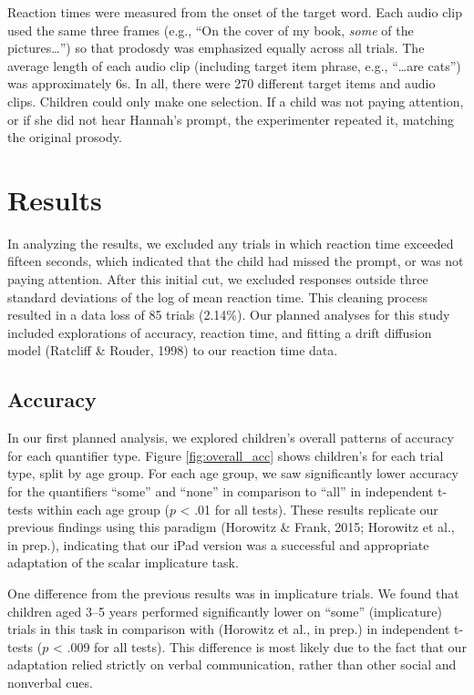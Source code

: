 \documentclass[10pt, letterpaper]{article}
\begin{document}
Reaction times were measured from the onset of the target word. Each
audio clip used the same three frames (e.g., ``On the cover of my book,
\emph{some} of the pictures\ldots{}'') so that prodosdy was emphasized
equally across all trials. The average length of each audio clip
(including target item phrase, e.g., ``\ldots{}are cats'') was
approximately 6s. In all, there were 270 different target items and
audio clips. Children could only make one selection. If a child was not
paying attention, or if she did not hear Hannah's prompt, the
experimenter repeated it, matching the original prosody.

\section{Results}\label{results}

In analyzing the results, we excluded any trials in which reaction time
exceeded fifteen seconds, which indicated that the child had missed the
prompt, or was not paying attention. After this initial cut, we excluded
responses outside three standard deviations of the log of mean reaction
time. This cleaning process resulted in a data loss of 85 trials
(2.14\%). Our planned analyses for this study included explorations of
accuracy, reaction time, and fitting a drift diffusion model (Ratcliff
\& Rouder, 1998) to our reaction time data.

\subsection{Accuracy}\label{accuracy}

In our first planned analysis, we explored children's overall patterns
of accuracy for each quantifier type. Figure \ref{fig:overall_acc} shows
children's for each trial type, split by age group. For each age group,
we saw significantly lower accuracy for the quantifiers ``some'' and
``none'' in comparison to ``all'' in independent t-tests within each age
group (\(p\) \textless{} .01 for all tests). These results replicate our
previous findings using this paradigm (Horowitz \& Frank, 2015; Horowitz
et al., in prep.), indicating that our iPad version was a successful and
appropriate adaptation of the scalar implicature task.

One difference from the previous results was in implicature trials. We
found that children aged 3--5 years performed significantly lower on
``some'' (implicature) trials in this task in comparison with (Horowitz
et al., in prep.) in independent t-tests (\(p\) \textless{} .009 for all
tests). This difference is most likely due to the fact that our
adaptation relied strictly on verbal communication, rather than other
social and nonverbal cues.
\end{document}
